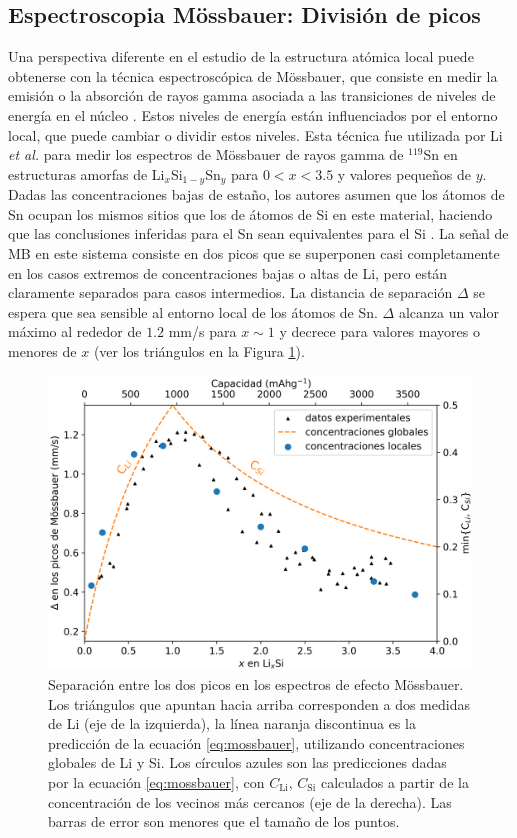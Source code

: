 \subsection{Espectroscopia Mössbauer: División de picos}

Una perspectiva diferente en el estudio de la estructura atómica local puede 
obtenerse con la técnica espectroscópica de Mössbauer, que consiste en medir 
la emisión o la absorción de rayos gamma asociada a las transiciones de niveles
de energía en el núcleo \cite{long2013}. Estos niveles de energía están 
influenciados por el entorno local, que puede cambiar o dividir estos niveles.
Esta técnica fue utilizada por Li \textit{et al.} \cite{li2009} para medir los espectros de 
Mössbauer de rayos gamma de $^{119}$Sn en estructuras amorfas de 
Li$_x$Si$_{1-y}$Sn$_y$ para $0 < x < 3.5$ y valores pequeños de $y$.
Dadas las concentraciones bajas de estaño, los autores asumen que los átomos de Sn
ocupan los mismos sitios que los de átomos de Si en este material, haciendo que 
las conclusiones inferidas para el Sn sean equivalentes para el Si 
\cite{hatchard2005}. La señal de MB en este sistema consiste en dos picos que se superponen casi 
completamente en los casos extremos de concentraciones bajas o altas de Li, 
pero están claramente separados para casos intermedios. La distancia de separación
$\Delta$ se espera que sea sensible al entorno local de los átomos de Sn. $\Delta$
alcanza un valor máximo al rededor de $1.2$ mm/s para $x \sim 1$ y decrece para 
valores mayores o menores de $x$ (ver los triángulos en la Figura \ref{fig:mossbauer}).
\begin{figure}[h!]
    \centering
    \includegraphics[width=.7\textwidth]{Silicio/prediccion/resultados/mossbauer/mossbauer.png}
    \caption{Separación entre los dos picos en los espectros de efecto 
    Mössbauer. Los triángulos que apuntan hacia arriba corresponden a dos 
    medidas de Li  \cite{li2009} (eje de la izquierda), la línea naranja discontinua es la 
    predicción de la ecuación \ref{eq:mossbauer}, utilizando concentraciones 
    globales de Li y Si. Los círculos azules son las predicciones dadas 
    por la ecuación \ref{eq:mossbauer}, con $C_{\text{Li}}$, $C_{\text{Si}}$ 
    calculados a partir de la concentración de los vecinos más cercanos (eje de 
    la derecha). Las barras de error son menores que el tamaño de los puntos.}
    \label{fig:mossbauer}
\end{figure}
